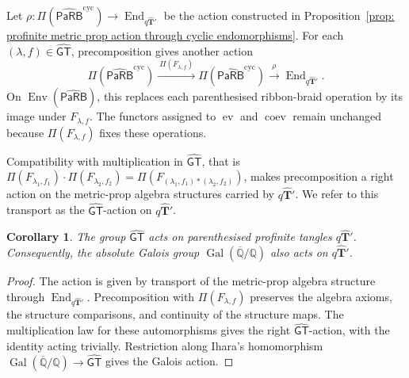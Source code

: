 \documentclass{amsart}
\newcommand{\bT}{\mathbf{T}}
\newcommand{\PaRB}{\mathsf{PaRB}}
\newcommand{\End}{\operatorname{End}}
\newcommand{\ev}{\operatorname{ev}}
\newcommand{\coev}{\operatorname{coev}}
\newcommand{\Env}{\operatorname{Env}}
\newcommand{\GT}{\widehat{\mathsf{GT}}}
\newtheorem{cor}[theorem]{Corollary}%
\theoremstyle{definition}
\numberwithin{equation}{section}
\begin{document}
Let $\rho\colon
\Pi(\widehat{\PaRB}^{\mathrm{cyc}})
\to\End_{q\widehat{\bT}'}$
be the action constructed in
Proposition~\ref{prop: profinite metric prop action through cyclic endomorphisms}.
For each $(\lambda,f)\in\GT$, precomposition gives another action
\[
\Pi(\widehat{\PaRB}^{\mathrm{cyc}})
\xrightarrow{\ \Pi(F_{\lambda,f})\ }
\Pi(\widehat{\PaRB}^{\mathrm{cyc}})
\xrightarrow{\ \rho\ }
\End_{q\widehat{\bT}'}.
\]
On $\Env(\widehat{\PaRB})$, this replaces each parenthesised
ribbon-braid operation by its image under $F_{\lambda,f}$.
The functors assigned to $\ev$ and $\coev$ remain unchanged because
$\Pi(F_{\lambda,f})$ fixes these operations.

Compatibility with multiplication in $\GT$, that is $\Pi(F_{\lambda_1,f_1}) \cdot \Pi(F_{\lambda_2,f_2}) = \Pi(F_{(\lambda_1,f_1)\ast (\lambda_2,f_2)})$,  makes precomposition
a right action on the metric-prop algebra structures carried by
$q\widehat{\bT}'$. We refer to this transport as the $\GT$-action
on $q\widehat{\bT}'$.

\begin{cor}
\label{cor:Galois_action_qT}
The group $\GT$ acts on parenthesised profinite tangles
$q\widehat{\bT}'$. Consequently, the absolute Galois group
$\operatorname{Gal}(\overline{\mathbb Q}/\mathbb Q)$
also acts on $q\widehat{\bT}'$.
\end{cor}

\begin{proof}
The action is given by transport of the metric-prop algebra
structure through $\End_{q\widehat{\bT}'}$.
Precomposition with $\Pi(F_{\lambda,f})$ preserves the algebra
axioms, the structure comparisons, and continuity of the
structure maps. The multiplication law for these automorphisms
gives the right $\GT$-action, with the identity acting trivially.
Restriction along Ihara's homomorphism
$\operatorname{Gal}(\overline{\mathbb Q}/\mathbb Q)\to\GT$
gives the Galois action.
\end{proof}
\end{document}

